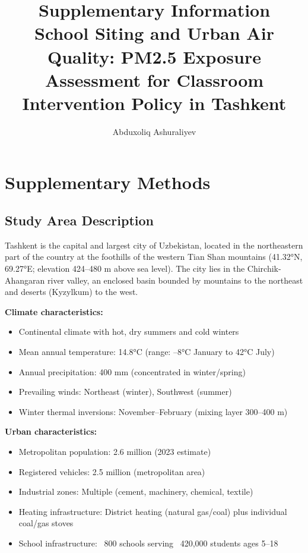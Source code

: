 \documentclass[11pt,a4paper]{article}
\title{\Large\textbf{Supplementary Information}\\[0.5cm]
\large School Siting and Urban Air Quality: PM2.5 Exposure Assessment for Classroom Intervention Policy in Tashkent}
\author{Abduxoliq Ashuraliyev}
\date{}
\begin{document}
\maketitle

\tableofcontents
\newpage

\section{Supplementary Methods}

\subsection{Study Area Description}

Tashkent is the capital and largest city of Uzbekistan, located in the northeastern part of the country at the foothills of the western Tian Shan mountains (41.32°N, 69.27°E; elevation 424--480 m above sea level). The city lies in the Chirchik-Ahangaran river valley, an enclosed basin bounded by mountains to the northeast and deserts (Kyzylkum) to the west.

\textbf{Climate characteristics:}
\begin{itemize}
    \item Continental climate with hot, dry summers and cold winters
    \item Mean annual temperature: 14.8°C (range: --8°C January to 42°C July)
    \item Annual precipitation: 400 mm (concentrated in winter/spring)
    \item Prevailing winds: Northeast (winter), Southwest (summer)
    \item Winter thermal inversions: November--February (mixing layer 300--400 m)
\end{itemize}

\textbf{Urban characteristics:}
\begin{itemize}
    \item Metropolitan population: 2.6 million (2023 estimate)
    \item Registered vehicles: 2.5 million (metropolitan area)
    \item Industrial zones: Multiple (cement, machinery, chemical, textile)
    \item Heating infrastructure: District heating (natural gas/coal) plus individual coal/gas stoves
    \item School infrastructure: ~800 schools serving ~420,000 students ages 5--18
\end{itemize}
\end{document}
